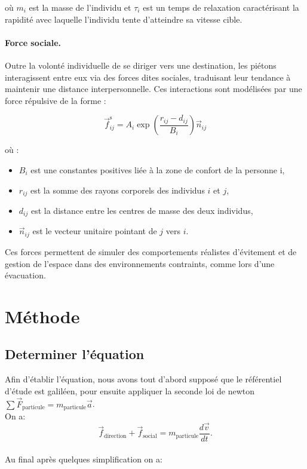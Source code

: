 \documentclass[a4paper,12pt]{article}
\begin{document}
où $m_i$ est la masse de l'individu et $\tau_i$ est un temps de relaxation caractérisant la rapidité avec laquelle l'individu tente d’atteindre sa vitesse cible.

\paragraph{Force sociale.}
Outre la volonté individuelle de se diriger vers une destination, les piétons interagissent entre eux via des forces dites sociales, traduisant leur tendance à maintenir une distance interpersonnelle. Ces interactions sont modélisées par une force répulsive de la forme :

\begin{equation}
\label{eq:force_sociale}
\vec{f}_{ij}^{\text{s}} = A_i \exp\left(\frac{r_{ij} - d_{ij}}{B_i}\right) \vec{n}_{ij}
\end{equation}

où :
\begin{itemize}
  \item  $B_i$ est une constantes positives liée à la zone de confort de la personne i,
  \item $r_{ij}$ est la somme des rayons corporels des individus $i$ et $j$,
  \item $d_{ij}$ est la distance entre les centres de masse des deux individus,
  \item $\vec{n}_{ij}$ est le vecteur unitaire pointant de $j$ vers $i$.
\end{itemize}

Ces forces permettent de simuler des comportements réalistes d’évitement et de gestion de l’espace dans des environnements contraints, comme lors d’une évacuation.


\section{Méthode}

\subsection{Determiner l'équation}

\indent Afin d’établir l’équation, nous avons tout d’abord supposé que le référentiel d’étude est galiléen, pour ensuite appliquer la seconde loi de newton $\sum \vec{F}_{\text{particule}} = m_{\text{particule}} \vec{a}$.
\\On a:
\[
\vec{f}_{\text{direction}} + \vec{f}_{\text{social}} = m_{\text{particule}} \frac{d\vec{v}}{dt}.
\]
\\ Au final après quelques simplification on a:
\end{document}
